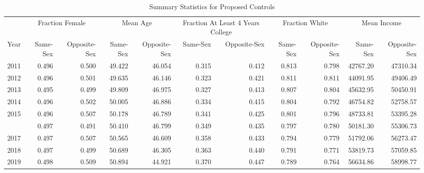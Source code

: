 \begin{table}

\caption{Summary Statistics for Proposed Controls}
\centering
\begin{tabular}[t]{rrrrrrrrrrr}
\toprule
\multicolumn{1}{c}{ } & \multicolumn{2}{c}{Fraction Female} & \multicolumn{2}{c}{Mean Age} & \multicolumn{2}{c}{Fraction At Least 4 Years College} & \multicolumn{2}{c}{Fraction White} & \multicolumn{2}{c}{Mean Income} \\
\cmidrule(l{3pt}r{3pt}){2-3} \cmidrule(l{3pt}r{3pt}){4-5} \cmidrule(l{3pt}r{3pt}){6-7} \cmidrule(l{3pt}r{3pt}){8-9} \cmidrule(l{3pt}r{3pt}){10-11}
Year & Same-Sex & Opposite-Sex & Same-Sex & Opposite-Sex & Same-Sex & Opposite-Sex & Same-Sex & Opposite-Sex & Same-Sex & Opposite-Sex\\
\midrule
2011 & 0.496 & 0.500 & 49.422 & 46.054 & 0.315 & 0.412 & 0.813 & 0.798 & 42767.20 & 47310.34\\
2012 & 0.496 & 0.501 & 49.635 & 46.146 & 0.323 & 0.421 & 0.811 & 0.811 & 44091.95 & 49406.49\\
2013 & 0.495 & 0.499 & 49.809 & 46.975 & 0.327 & 0.413 & 0.807 & 0.804 & 45632.95 & 50450.91\\
2014 & 0.496 & 0.502 & 50.005 & 46.886 & 0.334 & 0.415 & 0.804 & 0.792 & 46754.82 & 52758.57\\
2015 & 0.496 & 0.507 & 50.178 & 46.789 & 0.341 & 0.425 & 0.801 & 0.796 & 48733.81 & 53395.28\\
\addlinespace
2016 & 0.497 & 0.491 & 50.410 & 46.799 & 0.349 & 0.435 & 0.797 & 0.780 & 50181.30 & 55306.73\\
2017 & 0.497 & 0.507 & 50.565 & 46.609 & 0.358 & 0.433 & 0.794 & 0.779 & 51792.06 & 56273.47\\
2018 & 0.497 & 0.499 & 50.689 & 46.305 & 0.363 & 0.440 & 0.791 & 0.771 & 53819.73 & 57059.85\\
2019 & 0.498 & 0.509 & 50.894 & 44.921 & 0.370 & 0.447 & 0.789 & 0.764 & 56634.86 & 58998.77\\
\bottomrule
\end{tabular}
\end{table}
